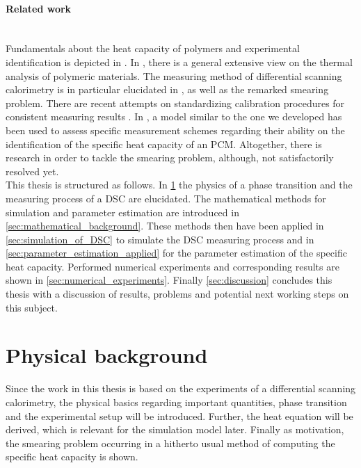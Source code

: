 \documentclass{scrartcl}[12pt, halfparskip]
\numberwithin{equation}{section}
\numberwithin{figure}{section}
\numberwithin{table}{section}
\begin{document}
\paragraph{Related work} \mbox{}\\
Fundamentals about the heat capacity of polymers and experimental identification is depicted in \cite{wunderlich_heat_capacity_polymers}.
In \cite{wunderlich_thermal_analysis}, there is a general extensive view on the thermal analysis of polymeric materials.
The measuring method of differential scanning calorimetry is in particular elucidated in \cite{Hoehne_DSC}, as well as the remarked smearing problem. 
There are recent attempts on standardizing calibration procedures for consistent measuring results \cite{standardization_of_PCM}. 
In \cite{diss_DSC}, a model similar to the one we developed has been used to assess specific measurement schemes regarding their ability on the identification of the specific heat capacity of an PCM. 
Altogether, there is research in order to tackle the smearing problem, although, not satisfactorily resolved yet. \\

This thesis is structured as follows. In \cref{sec:physical_background} the physics of a phase transition and the measuring process of a DSC are elucidated. 
The mathematical methods for simulation and parameter estimation are introduced in \cref{sec:mathematical_background}. These methods then have been applied in \cref{sec:simulation_of_DSC} to simulate the DSC measuring process and in \cref{sec:parameter_estimation_applied} for the parameter estimation of the specific heat capacity. Performed numerical experiments and corresponding results are shown in \cref{sec:numerical_experiments}. Finally \cref{sec:discussion} concludes this thesis with a discussion of results, problems and potential next working steps on this subject.


\section{Physical background}
\label{sec:physical_background}

Since the work in this thesis is based on the experiments of a differential scanning calorimetry, the physical basics regarding important quantities, phase transition and the experimental setup will be introduced. Further, the heat equation will be derived, which is relevant for the simulation model later. Finally as motivation, the smearing problem occurring in a hitherto usual method of computing the specific heat capacity is shown.
\end{document}
